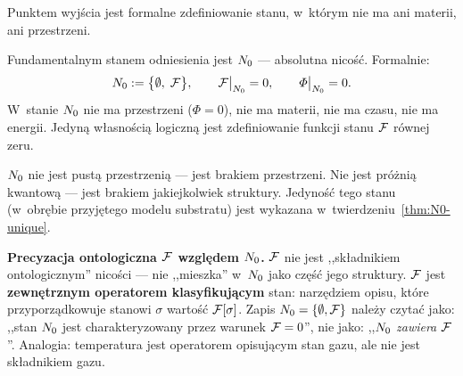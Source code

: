 Punktem wyj\'scia jest formalne zdefiniowanie stanu,
w~kt\'orym nie ma ani materii, ani przestrzeni.

\begin{axiom}[Nico\'s\'c]\label{ax:N0}
Fundamentalnym stanem odniesienia jest $N_0$ ---
absolutna nico\'s\'c. Formalnie:
\begin{equation}
    N_0 := \bigl\{\emptyset,\;\mathcal{F}\bigr\},
    \qquad
    \mathcal{F}\big|_{N_0} = 0,
    \qquad
    \varPhi\big|_{N_0} = 0.
\end{equation}
W~stanie $N_0$ nie ma przestrzeni ($\Phi = 0$), nie ma materii,
nie ma czasu, nie ma energii. Jedyn\k{a} w\l{}asno\'sci\k{a} logiczn\k{a}
jest zdefiniowanie funkcji stanu $\mathcal{F}$ r\'ownej zeru.
\end{axiom}

$N_0$ nie jest pust\k{a} przestrzeni\k{a} --- jest brakiem
przestrzeni. Nie jest pr\'o\.zni\k{a} kwantow\k{a} --- jest brakiem
jakiejkolwiek struktury. Jedyno\'s\'c tego stanu (w~obr\k{e}bie
przyj\k{e}tego modelu substratu) jest wykazana
w~twierdzeniu~\ref{thm:N0-unique}.

\medskip\noindent\textbf{Precyzacja ontologiczna $\mathcal{F}$
wzgl\k{e}dem $N_0$.}\;
$\mathcal{F}$ nie jest ,,sk\l{}adnikiem ontologicznym'' nico\'sci ---
nie ,,mieszka'' w~$N_0$ jako cz\k{e}\'s\'c jego struktury.
$\mathcal{F}$ jest \textbf{zewn\k{e}trznym operatorem klasyfikuj\k{a}cym}
stan: narz\k{e}dziem opisu, kt\'ore przyporz\k{a}dkowuje stanowi
$\sigma$ warto\'s\'c $\mathcal{F}[\sigma]$.
Zapis $N_0 = \{\emptyset, \mathcal{F}\}$ nale\.zy czyta\'c jako:
,,stan $N_0$ jest charakteryzowany przez warunek $\mathcal{F} = 0$'',
nie jako: ,,$N_0$ \emph{zawiera} $\mathcal{F}$''.
Analogia: temperatura jest operatorem opisuj\k{a}cym stan gazu,
ale nie jest sk\l{}adnikiem gazu.

